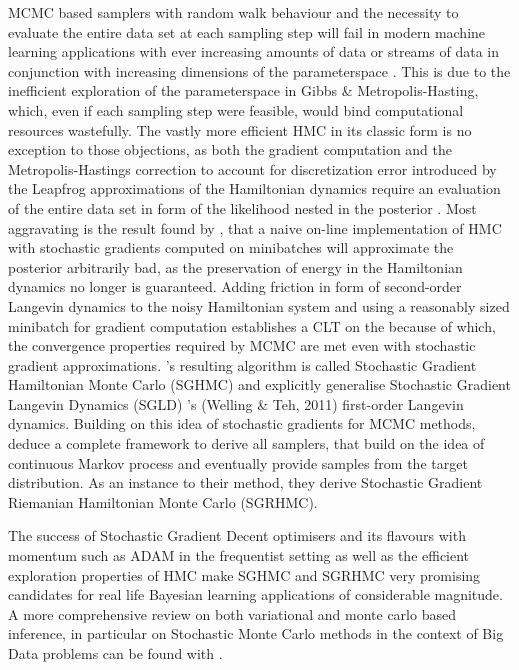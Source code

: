 \documentclass[11pt]{article}
\begin{document}
    MCMC based samplers with random walk behaviour and the necessity to evaluate the entire data set at each sampling step will fail in modern machine learning applications with ever increasing amounts of data or streams of data in conjunction with increasing dimensions of the parameterspace . This is due to the inefficient exploration of the parameterspace in Gibbs \& Metropolis-Hasting, which, even if each sampling step were feasible, would bind computational resources wastefully.
    The vastly more efficient HMC in its classic form is no exception to those objections, as both the gradient computation and the Metropolis-Hastings correction to account for discretization error introduced by the Leapfrog approximations of the Hamiltonian dynamics require an evaluation of the entire data set in form of the likelihood nested in the posterior \citep{zhu2017big}.
    Most aggravating is the result found by \citep{chen2014stochastic}, that a naive on-line implementation of HMC with stochastic gradients computed on minibatches will approximate the posterior arbitrarily bad, as the preservation of energy in the Hamiltonian dynamics no longer is guaranteed. Adding friction in form of second-order Langevin dynamics to the noisy Hamiltonian system and using a reasonably sized minibatch for gradient computation establishes a CLT on the because of which, the convergence properties required by MCMC are met even with stochastic gradient approximations. \citep{chen2014stochastic}'s resulting algorithm is called Stochastic Gradient Hamiltonian Monte Carlo (SGHMC) and explicitly generalise Stochastic Gradient Langevin Dynamics (SGLD) \citep{welling2011bayesian}'s (Welling \& Teh, 2011) first-order Langevin dynamics.
    Building on this idea of stochastic gradients for MCMC methods, \citep{ma2015complete} deduce a complete framework to derive all samplers, that build on the idea of continuous Markov process and eventually provide samples from the target distribution. As an instance to their method, they derive Stochastic Gradient Riemanian Hamiltonian Monte Carlo (SGRHMC).



    The success of Stochastic Gradient Decent optimisers and its flavours with momentum such as ADAM \citep{ADAM} in the frequentist setting  as well as the efficient exploration properties of HMC make SGHMC and SGRHMC very promising candidates for real life Bayesian learning applications of considerable magnitude.
    A more comprehensive review on both variational and monte carlo based inference, in particular on Stochastic Monte Carlo methods in the context of Big Data problems can be found with \citep{zhu2017big}.
\end{document}

